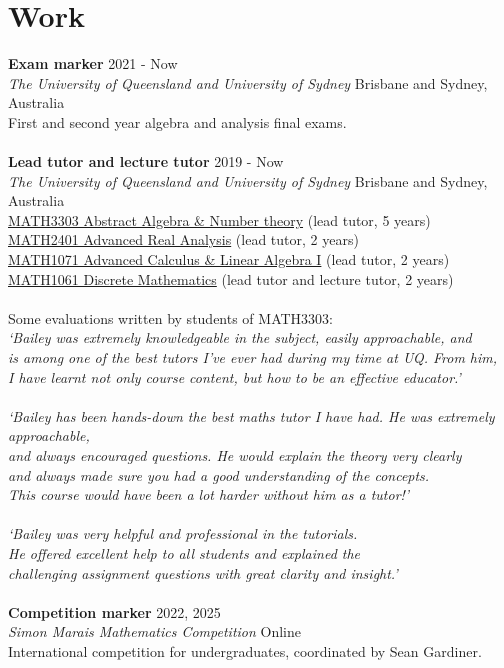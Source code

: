 \documentclass[8pt]{amsart}
\begin{document}
\section*{\LARGE Work}
\textbf{Exam marker} \hfill 2021 - Now \\
\emph{The University of Queensland and University of Sydney} \hfill Brisbane and Sydney, Australia \\
First and second year algebra and analysis final exams. \\
\ \\
\textbf{Lead tutor and lecture tutor} \hfill 2019 - Now \\
\emph{The University of Queensland and University of Sydney} \hfill Brisbane and Sydney, Australia \\
\href{https://my.uq.edu.au/programs-courses/course.html?course\textunderscore code=MATH3303}{MATH3303 Abstract Algebra \& Number theory} (lead tutor, 5 years) \\
\href{https://my.uq.edu.au/programs-courses/course.html?course\textunderscore code=MATH2401}{MATH2401 Advanced Real Analysis} (lead tutor, 2 years) \\
\href{https://my.uq.edu.au/programs-courses/course.html?course\textunderscore code=MATH1071}{MATH1071 Advanced Calculus \& Linear Algebra I} (lead tutor, 2 years) \\
\href{https://my.uq.edu.au/programs-courses/course.html?course\textunderscore code=MATH1061}{MATH1061 Discrete Mathematics} (lead tutor and lecture tutor, 2 years) \\
\ \\
Some evaluations written by students of MATH3303: \\
\emph{`Bailey was extremely knowledgeable in the subject, easily approachable, and \\
is among one of the best tutors I've ever had during my time at UQ. From him, \\
I have learnt not only course content, but how to be an effective educator.'} \\
\ \\
\emph{`Bailey has been hands-down the best maths tutor I have had. He was extremely approachable, \\
and always encouraged questions. He would explain the theory very clearly \\
and always made sure you had a good understanding of the concepts. \\
This course would have been a lot harder without him as a tutor!'} \\
\ \\
\emph{`Bailey was very helpful and professional in the tutorials. \\
He offered excellent help to all students and explained the \\
challenging assignment questions with great clarity and insight.'} \\
\ \\
\textbf{Competition marker} \hfill 2022, 2025 \\
\emph{Simon Marais Mathematics Competition} \hfill Online \\
International competition for undergraduates, coordinated by Sean Gardiner. 
\end{document}
